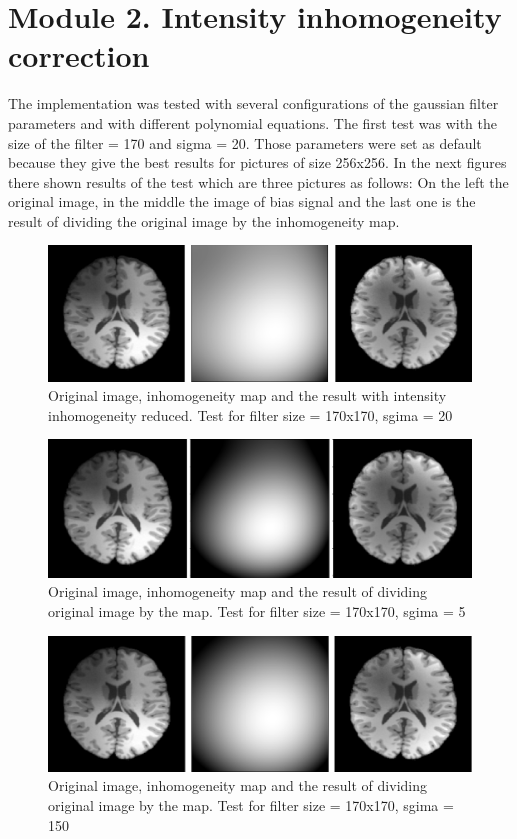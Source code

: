 \section{Module 2. Intensity inhomogeneity correction}
The implementation was tested with several configurations of the gaussian filter parameters and with different polynomial equations.
The first test was with the size of the filter = 170 and sigma = 20. Those parameters were set as default because they give the best results for pictures of size 256x256. In the next figures there shown results of the test which are three pictures as follows: On the left the original image, in the middle the image of bias signal and the last one is the result of dividing the original image by the inhomogeneity map.
\\
\begin{figure}[H]
\centering{}\includegraphics[scale=0.5]{figures/Module_02/test1}\caption{Original image, inhomogeneity map and the result with intensity inhomogeneity reduced. Test for filter size = 170x170, sgima = 20} 
\label{fig: test2_1}
\end{figure}
\begin{figure}[H]
\centering{}\includegraphics[scale=0.5]{figures/Module_02/test2}\caption{Original image, inhomogeneity map and the result of dividing original image by the map. Test for filter size = 170x170, sgima = 5} 
\label{fig: test2_2}
\end{figure}
\begin{figure}[H]
\centering{}\includegraphics[scale=0.5]{figures/Module_02/test3}\caption{Original image, inhomogeneity map and the result of dividing original image by the map. Test for filter size = 170x170, sgima = 150} 
\label{fig: test2_3}
\end{figure}
